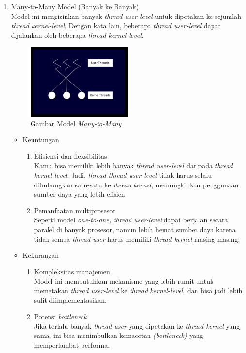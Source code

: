 \documentclass[12pt]{article}
\begin{document}
\begin{enumerate}
    \item Many-to-Many Model (Banyak ke Banyak)\\
    Model ini mengizinkan banyak \textit{thread user-level} 
    untuk dipetakan ke sejumlah \textit{thread kernel-level}. Dengan kata lain, 
    beberapa \textit{thread user-level} dapat dijalankan oleh beberapa 
    \textit{thread kernel-level}.
    \begin{figure}[h]
        \centering
        \includegraphics[width=0.5\textwidth]{asset/gambar-model-multithreading-many-to-many.jpg}
        \caption{Gambar Model \textit{Many-to-Many}}
    \end{figure}
    \begin{itemize}
        \item Keuntungan \\
            \begin{enumerate}
                \item Efisiensi dan fleksibilitas \\
                Kamu bisa memiliki lebih banyak \textit{thread user-level} daripada \textit{thread kernel-level}. Jadi, 
                \textit{thread-thread user-level} tidak harus selalu dihubungkan satu-satu ke \textit{thread kernel}, memungkinkan penggunaan sumber daya yang 
                lebih efisien
                \item Pemanfaatan multiprosesor \\
                Seperti model \textit{one-to-one, thread user-level} dapat berjalan secara paralel di banyak prosesor, 
                namun lebih hemat sumber daya karena tidak semua \textit{thread user} harus memiliki \textit{thread kernel} masing-masing.
            \end{enumerate}
        \item Kekurangan \\
            \begin{enumerate}
                \item Kompleksitas manajemen \\
                Model ini membutuhkan mekanisme yang lebih rumit untuk memetakan \textit{thread user-level} ke \textit{thread kernel-level}, dan bisa 
                jadi lebih sulit diimplementasikan.
                \item Potensi \textit{bottleneck} \\
                Jika terlalu banyak \textit{thread user} yang dipetakan ke \textit{thread kernel} yang sama, ini bisa menimbulkan kemacetan \textit{(bottleneck)} yang memperlambat performa.
            \end{enumerate}
    \end{itemize}


\end{enumerate}
\end{document}
